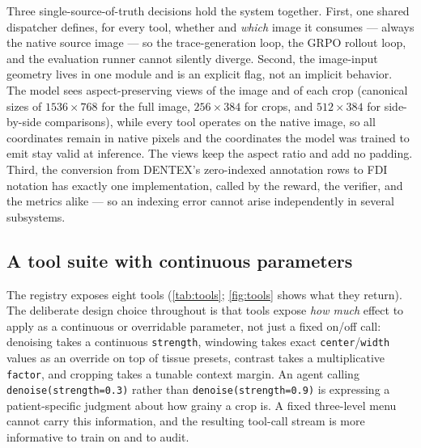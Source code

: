 Three single-source-of-truth decisions hold the system together. First, one shared dispatcher
defines, for every tool, whether and \emph{which} image it consumes --- always the native source
image --- so the trace-generation loop, the GRPO rollout loop, and the evaluation runner cannot
silently diverge. Second, the image-input geometry lives in one module and is an explicit
flag, not an implicit behavior. The model sees aspect-preserving views of the image and of each crop (canonical
sizes of $1536{\times}768$ for the full image, $256{\times}384$ for crops, and $512{\times}384$ for
side-by-side comparisons), while every tool operates on the native image, so all coordinates remain in native pixels and
the coordinates the model was trained to emit stay valid at inference. The views keep the aspect ratio and
add no padding.
Third, the conversion from DENTEX's zero-indexed annotation rows
to FDI notation has exactly one implementation, called by the reward, the verifier, and the
metrics alike --- so an indexing error cannot arise independently in several subsystems.


\subsection{A tool suite with continuous parameters}
\label{sec:tools}

The registry exposes eight tools (\cref{tab:tools}; \cref{fig:tools} shows what they return). The deliberate design choice throughout is
that tools expose \emph{how much} effect to apply as a continuous or overridable parameter, not
just a fixed on/off call: denoising takes a continuous \texttt{strength}, windowing takes exact
\texttt{center}/\texttt{width} values as an override on top of tissue presets, contrast takes a
multiplicative \texttt{factor}, and cropping takes a tunable context margin. An agent calling \texttt{denoise(strength=0.3)}
rather than \texttt{denoise(strength=0.9)} is expressing a patient-specific judgment about how
grainy a crop is. A fixed three-level menu cannot carry this information, and the resulting
tool-call stream is more informative to train on and to audit.

